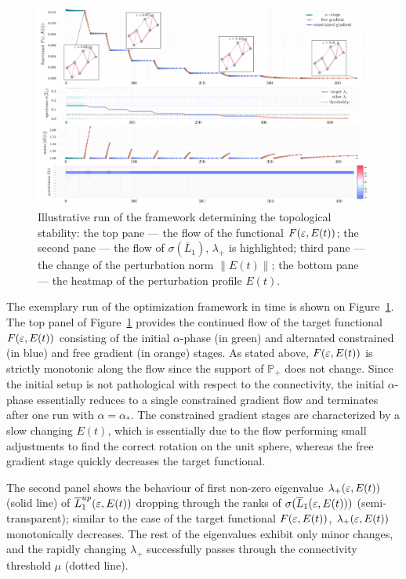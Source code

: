 \begin{figure}[t]
    \centering
    \includegraphics[width=1.0\textwidth,clip,trim=8pt 7pt 8pt 5pt]{figures/julia/test2.pdf}
    
    \caption{Illustrative run of the framework determining the topological stability: the top pane --- the flow of the functional $F(\varepsilon, E(t))$; the second pane --- the flow of $\sigma(\bar L_1)$, $\lambda_+$ is highlighted; third pane --- the change of the perturbation norm $\| E(t) \|$; the bottom pane --- the heatmap of the perturbation profile $E(t)$.
     \label{fig:illustrative}
    }
\end{figure}

The exemplary run of the optimization framework in time is shown on Figure~\ref{fig:illustrative}.
The top panel of Figure~\ref{fig:illustrative} provides the continued flow of the target functional $F(\varepsilon, E(t))$ consisting of the initial $\alpha$-phase (in green) and alternated constrained (in blue) and free gradient (in orange) stages. As stated above, $F(\varepsilon, E(t))$ is strictly monotonic along the flow since the support of $\mathbb P_+$  does not change. Since the initial setup is not pathological with respect to the connectivity, the initial  $\alpha$-phase essentially reduces to a single constrained gradient flow and terminates after one run with $\alpha=\alpha_*$.  The constrained gradient stages are characterized by a slow changing $E(t)$, which is essentially due to the flow performing small adjustments to find the correct rotation on the unit sphere, whereas the free gradient stage quickly decreases the target functional.

The second panel shows the  behaviour of first non-zero eigenvalue $\lambda_+(\varepsilon, E(t))$ (solid line) of $\overline{L}_1^{up}(\varepsilon, E(t))$ dropping through the ranks of $\sigma(\overline{L}_1(\varepsilon, E(t)))$ (semi-transparent); similar to the case of the target functional $F(\varepsilon, E(t))$, $\lambda_+(\varepsilon, E(t))$ monotonically decreases. The rest of the eigenvalues exhibit only minor changes, and the rapidly changing $\lambda_+$ successfully passes through the connectivity threshold $\mu$ (dotted line). 

